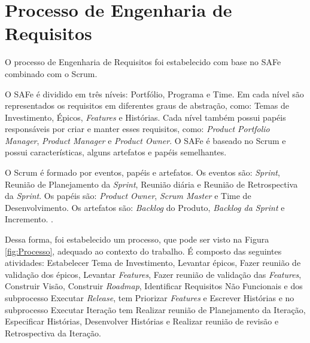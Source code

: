 \chapter[Processo de Engenharia de Requisitos]{Processo de Engenharia de Requisitos}

O processo de Engenharia de Requisitos foi estabelecido com base no SAFe combinado com o Scrum.

O SAFe é dividido em três níveis: Portfólio, Programa e Time. Em cada nível são representados os requisitos
em diferentes graus de abstração, como: Temas de Investimento, Épicos, \textit{Features} e Histórias.
Cada nível também possui papéis responsáveis por criar e manter esses requisitos, como: \textit{Product Portfolio Manager}, 
\textit{Product Manager} e \textit{Product Owner}. O SAFe é baseado no Scrum e
possui características, alguns artefatos e papéis semelhantes. \cite{safe}

% 

O Scrum é formado por eventos, papéis e artefatos. Os eventos são: \textit{Sprint}, Reunião de Planejamento
da \textit{Sprint}, Reunião diária e Reunião de Retrospectiva da \textit{Sprint}. Os papéis são: \textit{Product Owner},
\textit{Scrum Master} e Time de Desenvolvimento. Os artefatos são: \textit{Backlog} do Produto, \textit{Backlog da Sprint} e Incremento. \cite{scrum}.
% 


Dessa forma, foi estabelecido um processo, que pode ser visto na Figura \ref{fig:Processo}, adequado ao contexto do trabalho.
É composto das seguintes atividades: Estabelecer Tema de Investimento, Levantar épicos, Fazer reunião de validação dos épicos, 
Levantar \textit{Features}, Fazer reunião de validação das \textit{Features}, Construir Visão, Construir \textit{Roadmap}, Identificar Requisitos Não Funcionais e dos 
subprocesso Executar \textit{Release}, tem Priorizar \textit{Features} e Escrever
Histórias e no subprocesso Executar Iteração tem Realizar reunião de Planejamento da Iteração,
Especificar Histórias, Desenvolver Histórias e Realizar reunião de revisão e Retrospectiva da 
Iteração.

